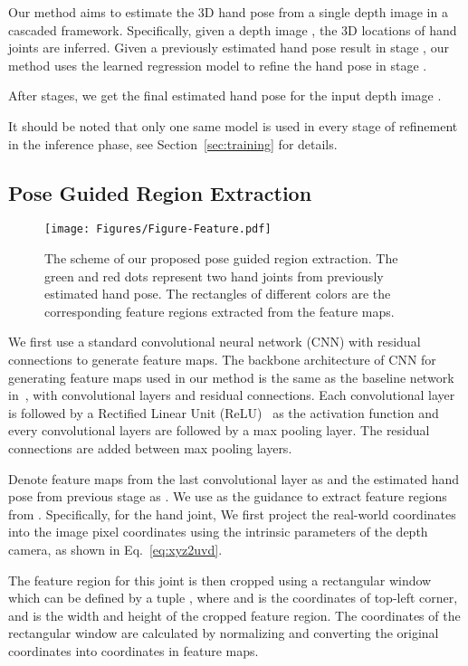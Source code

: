 \documentclass[final, 5p]{elsarticle}
\begin{document}
Our method aims to estimate the 3D hand pose from a single depth image in a cascaded framework. Specifically, given a depth image , the 3D locations  of  hand joints are inferred.  Given a previously estimated hand pose result  in stage , our method uses the learned regression model  to refine the hand pose in stage .

After  stages, we get the final estimated hand pose  for the input depth image .

It should be noted that only one same model  is used in every stage of refinement in the inference phase, see Section~\ref{sec:training} for details.

\subsection{Pose Guided Region Extraction}
\label{sec:pren}

\begin{figure}[!tb]
  \centering
    \centerline{\texttt{[image: Figures/Figure-Feature.pdf]}}
  \caption{The scheme of our proposed pose guided region extraction. The green and red dots represent two hand joints from previously estimated hand pose. The rectangles of different colors are the corresponding feature regions extracted from the feature maps.}
\label{fig:pose-feature}
\end{figure}

We first use a standard convolutional neural network (CNN) with residual connections to generate feature maps. The backbone architecture of CNN for generating feature maps used in our method is the same as the baseline network in~\cite{guo2017region}, with  convolutional layers and  residual connections. Each convolutional layer is followed by a Rectified Linear Unit (ReLU)~\cite{maas2013rectifier} as the activation function and every  convolutional layers are followed by a max pooling layer. The residual connections are added between max pooling layers.

Denote feature maps from the last convolutional layer as  and the estimated hand pose from previous stage as . We use  as the guidance to extract feature regions from . Specifically, for the  hand joint, We first project the real-world coordinates into the image pixel coordinates using the intrinsic parameters of the depth camera, as shown in Eq.~\ref{eq:xyz2uvd}.


The feature region for this joint is then cropped using a rectangular window which can be defined by a tuple , where  and  is the coordinates of top-left corner,  and  is the width and height of the cropped feature region.
The coordinates of the rectangular window are calculated by normalizing and converting the original coordinates  into coordinates in feature maps.
\end{document}
